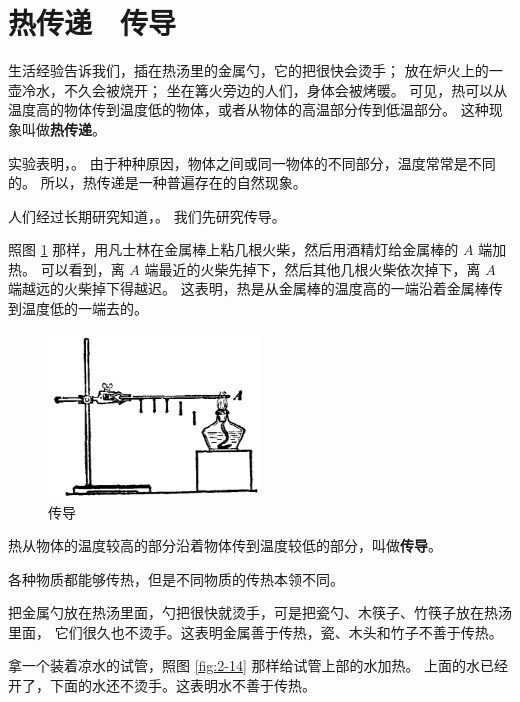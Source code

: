 \section{热传递　传导}\label{sec:2-5}

生活经验告诉我们，插在热汤里的金属勺，它的把很快会烫手；
放在炉火上的一壶冷水，不久会被烧开；
坐在篝火旁边的人们，身体会被烤暖。
可见，热可以从温度高的物体传到温度低的物体，或者从物体的高温部分传到低温部分。
这种现象叫做\textbf{热传递}。

实验表明，。
由于种种原因，物体之间或同一物体的不同部分，温度常常是不同的。
所以，热传递是一种普遍存在的自然现象。

人们经过长期研究知道，。
我们先研究传导。

照图 \ref{fig:2-13} 那样，用凡士林在金属棒上粘几根火柴，然后用酒精灯给金属棒的 $A$ 端加热。
可以看到，离 $A$ 端最近的火柴先掉下，然后其他几根火柴依次掉下，离 $A$ 端越远的火柴掉下得越迟。
这表明，热是从金属棒的温度高的一端沿着金属棒传到温度低的一端去的。

\begin{figure}[htbp]
    \centering
    \includegraphics[width=0.5\textwidth]{../pic/czwl2-ch2-13}
    \caption{传导}\label{fig:2-13}
\end{figure}

热从物体的温度较高的部分沿着物体传到温度较低的部分，叫做\textbf{传导}。

各种物质都能够传热，但是不同物质的传热本领不同。

把金属勺放在热汤里面，勺把很快就烫手，可是把瓷勺、木筷子、竹筷子放在热汤里面，
它们很久也不烫手。这表明金属善于传热，瓷、木头和竹子不善于传热。

拿一个装着凉水的试管，照图 \ref{fig:2-14} 那样给试管上部的水加热。
上面的水已经开了，下面的水还不烫手。这表明水不善于传热。

